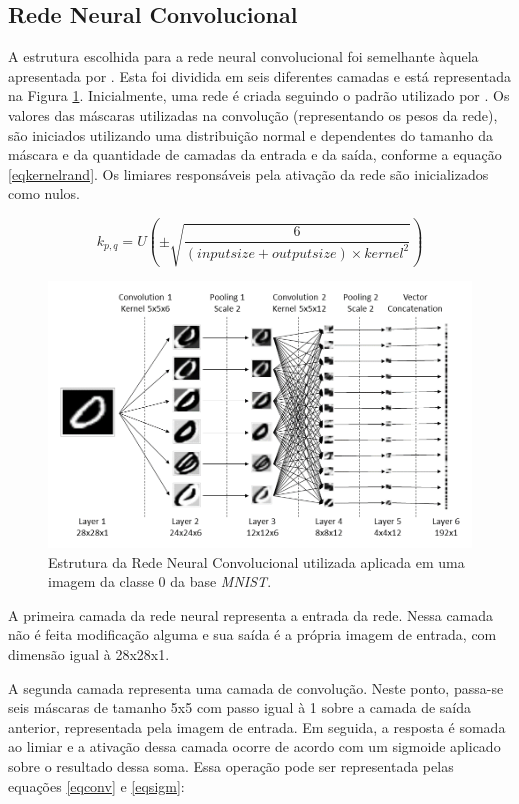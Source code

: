 \documentclass[conference]{IEEEtran}
\begin{document}
\subsection{Rede Neural Convolucional} \label{metod:struct}

A estrutura escolhida para a rede neural convolucional foi semelhante àquela apresentada por \cite{bpzhang}. Esta foi dividida em seis diferentes camadas e está representada na Figura \ref{figrede}. Inicialmente, uma rede é criada seguindo o padrão utilizado por \cite{bpzhang}. Os valores das máscaras utilizadas na convolução (representando os pesos da rede), são iniciados utilizando uma distribuição normal e dependentes do tamanho da máscara e da quantidade de camadas da entrada e da saída, conforme a equação \eqref{eqkernelrand}. Os limiares responsáveis pela ativação da rede são inicializados como nulos.

\begin{equation}
k_{p,q} = U \left ( \pm \sqrt { \frac {6} { ( inputsize + outputsize ) \times kernel^{2} } } \right  ) \label{eqkernelrand}
\end{equation}

\begin{figure}[b]
\centerline{\includegraphics[width=.95\columnwidth]{fig/net.png}}
\caption{Estrutura da Rede Neural Convolucional utilizada aplicada em uma imagem da classe $0$ da base \textit{MNIST}.}
\label{figrede}
\end{figure}

A primeira camada da rede neural representa a entrada da rede. Nessa camada não é feita modificação alguma e sua saída é a própria imagem de entrada, com dimensão igual à 28x28x1.

A segunda camada representa uma camada de convolução. Neste ponto, passa-se seis máscaras de tamanho 5x5 com passo igual à 1 sobre a camada de saída anterior, representada pela imagem de entrada. Em seguida, a resposta é somada ao limiar e a ativação dessa camada ocorre de acordo com um sigmoide aplicado sobre o resultado dessa soma. Essa operação pode ser representada pelas equações \eqref{eqconv} e \eqref{eqsigm}:
\end{document}
